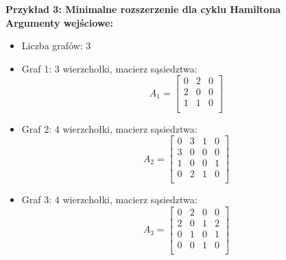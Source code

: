 \vspace{1em}

\noindent \textbf{Przykład 3: Minimalne rozszerzenie dla cyklu Hamiltona} \\

\noindent \textbf{Argumenty wejściowe:}
\begin{itemize}
    \item Liczba grafów: \(3\)
    \item Graf 1: \(3\) wierzchołki, macierz sąsiedztwa:
    \[
    A_1 = \begin{bmatrix}
    0 & 2 & 0 \\
    2 & 0 & 0 \\
    1 & 1 & 0 \\
    \end{bmatrix}
    \]
    \item Graf 2: \(4\) wierzchołki, macierz sąsiedztwa:
    \[
    A_2 = \begin{bmatrix}
    0 & 3 & 1 & 0 \\
    3 & 0 & 0 & 0 \\
    1 & 0 & 0 & 1 \\
    0 & 2 & 1 & 0 \\
    \end{bmatrix}
    \]
    \item Graf 3: \(4\) wierzchołki, macierz sąsiedztwa:
    \[
    A_3 = \begin{bmatrix}
    0 & 2 & 0 & 0 \\
    2 & 0 & 1 & 2 \\
    0 & 1 & 0 & 1 \\
    0 & 0 & 1 & 0 \\
    \end{bmatrix}
    \]
\end{itemize}

